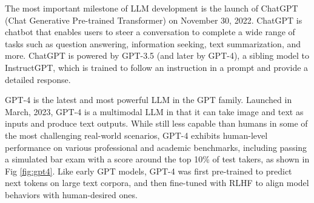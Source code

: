 \documentclass[conference]{IEEEtran}
\begin{document}
\iffalse
[Jianfeng: You missed ChatGPT.]
[SM: I wanted to add it, but wasn't able to find any paper, or white paper, or technical report,to cite there. What should we refer for ChatGPT here? could you add this part?]
[Jianfeng: ChatGPT is described in the OAI blog: https://openai.com/blog/chatgpt.]
\fi

The most important milestone of LLM development is the launch of ChatGPT (Chat Generative Pre-trained Transformer) \cite{chatgpt} on November 30, 2022. 
ChatGPT is chatbot that enables users to steer a conversation to complete a wide range of tasks such as question answering, information seeking, text summarization, and more.
ChatGPT is powered by GPT-3.5 (and later by GPT-4), a sibling model to InstructGPT, which is trained to follow an instruction in a prompt and provide a detailed response.



GPT-4 \cite{gpt4} is the latest and most powerful LLM in the GPT family.  Launched in March, 2023, GPT-4 is a multimodal LLM in that it can take image and text as inputs and produce text outputs. 
While still less capable than humans in some of the most challenging real-world scenarios, GPT-4 exhibits human-level performance on various professional and academic benchmarks, including passing a simulated bar exam with a score around the top 10\% of test takers, as shown in Fig \ref{fig:gpt4}.
Like early GPT models, GPT-4 was first pre-trained to predict next tokens on large text corpora, and then fine-tuned with RLHF to align model behaviors with human-desired ones. 
\end{document}
